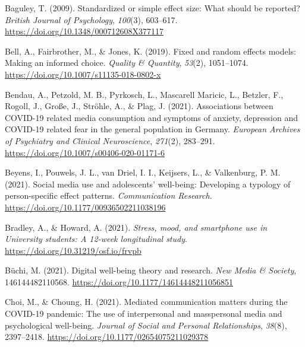 \documentclass[
  man,mask]{apa7}
\newlength{\cslhangindent}
\newlength{\cslentryspacingunit} %
\newenvironment{CSLReferences}[2] %
 {%
  \setlength{\parindent}{0pt}
  \ifodd #1
  \let\oldpar\par
  \def\par{\hangindent=\cslhangindent\oldpar}
  \fi
  \setlength{\parskip}{#2\cslentryspacingunit}
 }%
 {}
\begin{document}
\hypertarget{refs}{}
\begin{CSLReferences}{1}{0}
\leavevmode{}%
Baguley, T. (2009). Standardized or simple effect size: {What} should be reported? \emph{British Journal of Psychology}, \emph{100}(3), 603--617. \url{https://doi.org/10.1348/000712608X377117}

\leavevmode{}%
Bell, A., Fairbrother, M., \& Jones, K. (2019). Fixed and random effects models: Making an informed choice. \emph{Quality \& Quantity}, \emph{53}(2), 1051--1074. \url{https://doi.org/10.1007/s11135-018-0802-x}

\leavevmode{}%
Bendau, A., Petzold, M. B., Pyrkosch, L., Mascarell Maricic, L., Betzler, F., Rogoll, J., Große, J., Ströhle, A., \& Plag, J. (2021). Associations between {COVID-19} related media consumption and symptoms of anxiety, depression and {COVID-19} related fear in the general population in {Germany}. \emph{European Archives of Psychiatry and Clinical Neuroscience}, \emph{271}(2), 283--291. \url{https://doi.org/10.1007/s00406-020-01171-6}

\leavevmode{}%
Beyens, I., Pouwels, J. L., van Driel, I. I., Keijsers, L., \& Valkenburg, P. M. (2021). Social media use and adolescents' well-being: {Developing} a typology of person-specific effect patterns. \emph{Communication Research}. \url{https://doi.org/10.1177/00936502211038196}

\leavevmode{}%
Bradley, A., \& Howard, A. (2021). \emph{Stress, mood, and smartphone use in {University} students: {A} 12-week longitudinal study}. \url{https://doi.org/10.31219/osf.io/frvpb}

\leavevmode{}%
Büchi, M. (2021). Digital well-being theory and research. \emph{New Media \& Society}, 146144482110568. \url{https://doi.org/10.1177/14614448211056851}

\leavevmode{}%
Choi, M., \& Choung, H. (2021). Mediated communication matters during the {COVID-19} pandemic: {The} use of interpersonal and masspersonal media and psychological well-being. \emph{Journal of Social and Personal Relationships}, \emph{38}(8), 2397--2418. \url{https://doi.org/10.1177/02654075211029378}


\end{CSLReferences}
\end{document}
